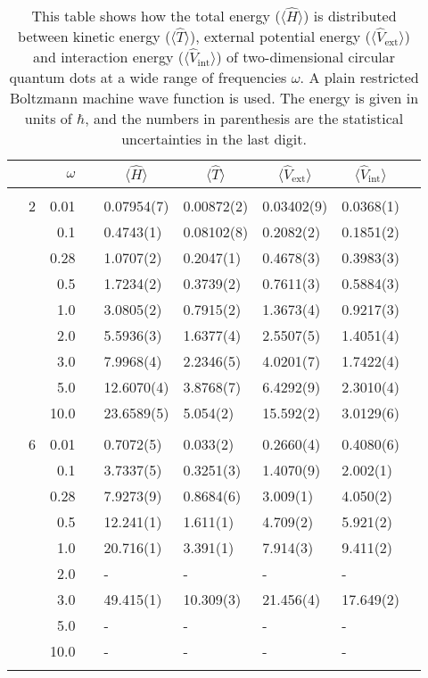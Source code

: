 \begin{table}[H]
	\caption{This table shows how the total energy ($\langle\hat{H}\rangle$) is distributed between kinetic energy ($\langle\hat{T}\rangle$), external potential energy ($\langle\hat{V}_{\text{ext}}\rangle$) and interaction energy ($\langle\hat{V}_{\text{int}}\rangle$) of two-dimensional circular quantum dots at a wide range of frequencies $\omega$. A plain restricted Boltzmann machine wave function is used. The energy is given in units of $\hbar$, and the numbers in parenthesis are the statistical uncertainties in the last digit.}
	\label{tab:splitfrequencyQDRBM}
	\begin{tabularx}{\textwidth}{R{1cm}rrcR{2.3cm}R{2.3cm}R{2.3cm}R{2.3cm}R{1cm}} \hline\hline
		&\makecell{\\ \phantom{$N$} \\ \phantom{=}} & $\omega$ &&  &  &  &  & \\ \hline \\
		&2 & 0.01 && 0.07954(7) & 0.00872(2) & 0.03402(9) & 0.0368(1) \\
		&& 0.1 && 0.4743(1) & 0.08102(8) & 0.2082(2) & 0.1851(2) \\
		&& 0.28 && 1.0707(2) & 0.2047(1) & 0.4678(3) & 0.3983(3) \\
		&& 0.5 && 1.7234(2) & 0.3739(2) & 0.7611(3) & 0.5884(3)\\
		&& 1.0 && 3.0805(2) & 0.7915(2) & 1.3673(4) & 0.9217(3)\\
		&& 2.0 && 5.5936(3) & 1.6377(4) & 2.5507(5) & 1.4051(4) \\
		&& 3.0 && 7.9968(4) & 2.2346(5) & 4.0201(7) & 1.7422(4) \\ 
		&& 5.0 && 12.6070(4) & 3.8768(7) & 6.4292(9) & 2.3010(4) \\
		&& 10.0 && 23.6589(5) & 5.054(2) & 15.592(2) & 3.0129(6) \\
		\hdashline \\
		
		&6 & 0.01 && 0.7072(5) & 0.033(2) & 0.2660(4) & 0.4080(6) \\
		&& 0.1 && 3.7337(5) & 0.3251(3) & 1.4070(9) & 2.002(1) \\
		&& 0.28 && 7.9273(9) & 0.8684(6) & 3.009(1) & 4.050(2) \\
		&& 0.5 && 12.241(1) & 1.611(1) & 4.709(2) & 5.921(2)\\
		&& 1.0 && 20.716(1) & 3.391(1) & 7.914(3) & 9.411(2)\\
		&& 2.0 && - & - & - & -\\
		&& 3.0 && 49.415(1) & 10.309(3) & 21.456(4) & 17.649(2) \\ 
		&& 5.0 && - & - & - & -\\
		&& 10.0 && - & - & - & -\\
		\hdashline \\
		

\end{tabularx}
\end{table}
